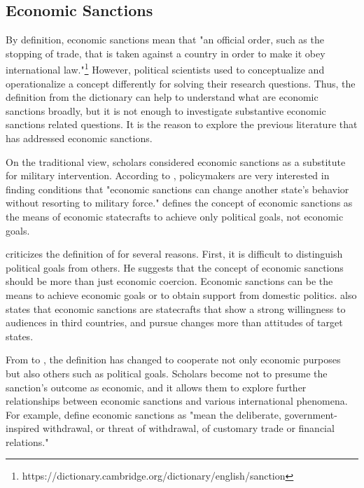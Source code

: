 \documentclass[11pt]{article}
\begin{document}
\subsection*{Economic Sanctions}

By definition, economic sanctions mean that "an official order, such as the stopping of trade, that is taken against a country in order to make it obey international law."\footnote{https://dictionary.cambridge.org/dictionary/english/sanction} However, political scientists used to conceptualize and operationalize a concept differently for solving their research questions. Thus, the definition from the dictionary can help to understand what are economic sanctions broadly, but it is not enough to investigate substantive economic sanctions related questions. It is the reason to explore the previous literature that has addressed economic sanctions.

On the traditional view, scholars considered economic sanctions as a substitute for military intervention. According to \citet[95]{Pape1997}, policymakers are very interested in finding conditions that "economic sanctions can change another state's behavior without resorting to military force." \citet{Pape1997} defines the concept of economic sanctions as the means of economic statecrafts to achieve only political goals, not economic goals.

\citet[191]{Baldwin1998} criticizes the definition of \citet{Pape1997} for several reasons. First, it is difficult to distinguish political goals from others. He suggests that the concept of economic sanctions should be more than just economic coercion. Economic sanctions can be the means to achieve economic goals or to obtain support from domestic politics. \citet{Baldwin1998} also states that economic sanctions are statecrafts that show a strong willingness to audiences in third countries, and pursue changes more than attitudes of target states.

From \citet{Pape1997} to \citet{Baldwin1998}, the definition has changed to cooperate not only economic purposes but also others such as political goals. Scholars become not to presume the sanction's outcome as economic, and it allows them to explore further relationships between economic sanctions and various international phenomena. For example, \citet[3]{Hufbauer2008} define economic sanctions as "mean the deliberate, government-inspired withdrawal, or threat of withdrawal, of customary trade or financial relations." 
\end{document}
